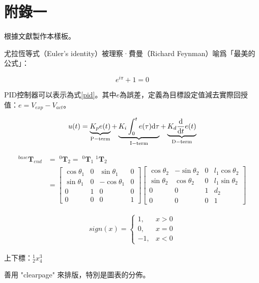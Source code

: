 \clearpage
\appendix
\chapter{附錄一}
\label{appendix}

根據文獻\cite{nfu2021}製作本樣板。

\vspace{1.5cm}

尤拉恆等式（Euler's identity）被理察·費曼（Richard Feynman）喻爲「最美的公式」：
\begin{Large}
\begin{equation}
    e^{i \pi} + 1 = 0 \label{euler-identity}
\end{equation}
\end{Large}

\vspace{1.5cm}

PID控制器可以表示為式\eqref{pid}。其中$e$為誤差，定義為目標設定值減去實際回授值：$e=V_{exp}-V_{act}$。

\begin{equation}
    u(t) = \underbrace{K_p e(t)}_{\rm P-term}
         + \underbrace{K_i \int_{0}^{t} e(\tau)\mathrm{d}\tau}_{\rm I-term}
         + \underbrace{K_d \frac{\mathrm{d}}{\mathrm{d}t} e(t)}_{\rm D-term}
    \label{pid}
\end{equation}

\vspace{1.5cm}

\begin{align}
^{base}\mathbf{T}_{end} &= \; ^0\mathbf{T}_2 = \; ^0\mathbf{T}_1 \; ^1\mathbf{T}_2 \\
&=
\begin{bmatrix}
\cos \theta_1&0&\sin \theta_1&0\\
\sin \theta_1&0&-\cos \theta_1&0\\
0&1&0&0\\
0&0&0&1
\end{bmatrix}
\begin{bmatrix}
\cos \theta_2&-\sin \theta_2&0&l_1\cos \theta_2\\
\sin \theta_2&\cos \theta_2&0&l_1\sin \theta_2\\
0&0&1&d_2\\
0&0&0&1
\end{bmatrix}
\end{align}

\begin{align}
sign(x) =
\left\{
    \begin{array}{rl}
    1, & x>0 \\
    0, & x=0 \\
    -1, & x<0
    \end{array}
\right.
\end{align}

\vspace{1.5cm}

上下標：$^1_2x^3_4$

\clearpage
善用 "clearpage" 來排版，特別是圖表的分佈。
